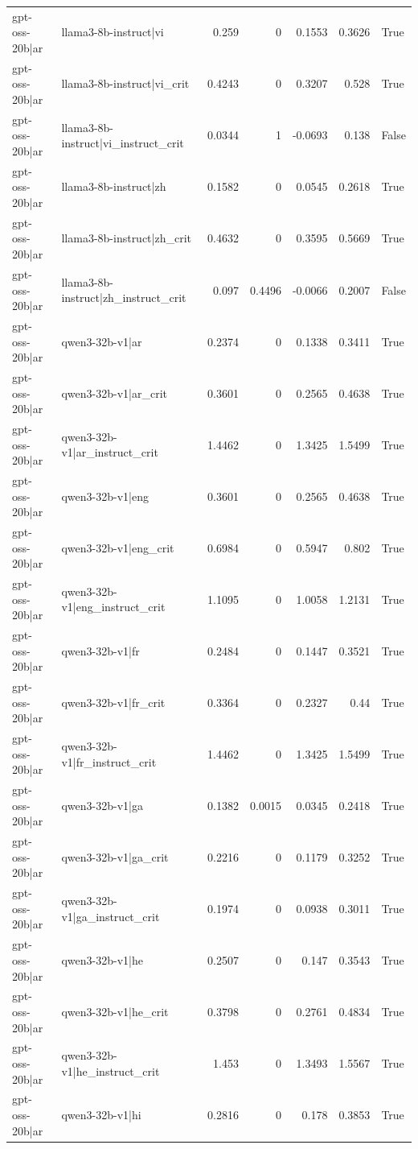 \begin{table}
\begin{tabular}{l l r r r r l}
gpt-oss-20b|ar & llama3-8b-instruct|vi & 0.259 & 0 & 0.1553 & 0.3626 & True \\
gpt-oss-20b|ar & llama3-8b-instruct|vi_crit & 0.4243 & 0 & 0.3207 & 0.528 & True \\
gpt-oss-20b|ar & llama3-8b-instruct|vi_instruct_crit & 0.0344 & 1 & -0.0693 & 0.138 & False \\
gpt-oss-20b|ar & llama3-8b-instruct|zh & 0.1582 & 0 & 0.0545 & 0.2618 & True \\
gpt-oss-20b|ar & llama3-8b-instruct|zh_crit & 0.4632 & 0 & 0.3595 & 0.5669 & True \\
gpt-oss-20b|ar & llama3-8b-instruct|zh_instruct_crit & 0.097 & 0.4496 & -0.0066 & 0.2007 & False \\
gpt-oss-20b|ar & qwen3-32b-v1|ar & 0.2374 & 0 & 0.1338 & 0.3411 & True \\
gpt-oss-20b|ar & qwen3-32b-v1|ar_crit & 0.3601 & 0 & 0.2565 & 0.4638 & True \\
gpt-oss-20b|ar & qwen3-32b-v1|ar_instruct_crit & 1.4462 & 0 & 1.3425 & 1.5499 & True \\
gpt-oss-20b|ar & qwen3-32b-v1|eng & 0.3601 & 0 & 0.2565 & 0.4638 & True \\
gpt-oss-20b|ar & qwen3-32b-v1|eng_crit & 0.6984 & 0 & 0.5947 & 0.802 & True \\
gpt-oss-20b|ar & qwen3-32b-v1|eng_instruct_crit & 1.1095 & 0 & 1.0058 & 1.2131 & True \\
gpt-oss-20b|ar & qwen3-32b-v1|fr & 0.2484 & 0 & 0.1447 & 0.3521 & True \\
gpt-oss-20b|ar & qwen3-32b-v1|fr_crit & 0.3364 & 0 & 0.2327 & 0.44 & True \\
gpt-oss-20b|ar & qwen3-32b-v1|fr_instruct_crit & 1.4462 & 0 & 1.3425 & 1.5499 & True \\
gpt-oss-20b|ar & qwen3-32b-v1|ga & 0.1382 & 0.0015 & 0.0345 & 0.2418 & True \\
gpt-oss-20b|ar & qwen3-32b-v1|ga_crit & 0.2216 & 0 & 0.1179 & 0.3252 & True \\
gpt-oss-20b|ar & qwen3-32b-v1|ga_instruct_crit & 0.1974 & 0 & 0.0938 & 0.3011 & True \\
gpt-oss-20b|ar & qwen3-32b-v1|he & 0.2507 & 0 & 0.147 & 0.3543 & True \\
gpt-oss-20b|ar & qwen3-32b-v1|he_crit & 0.3798 & 0 & 0.2761 & 0.4834 & True \\
gpt-oss-20b|ar & qwen3-32b-v1|he_instruct_crit & 1.453 & 0 & 1.3493 & 1.5567 & True \\
gpt-oss-20b|ar & qwen3-32b-v1|hi & 0.2816 & 0 & 0.178 & 0.3853 & True \\

\end{tabular}
\end{table}
